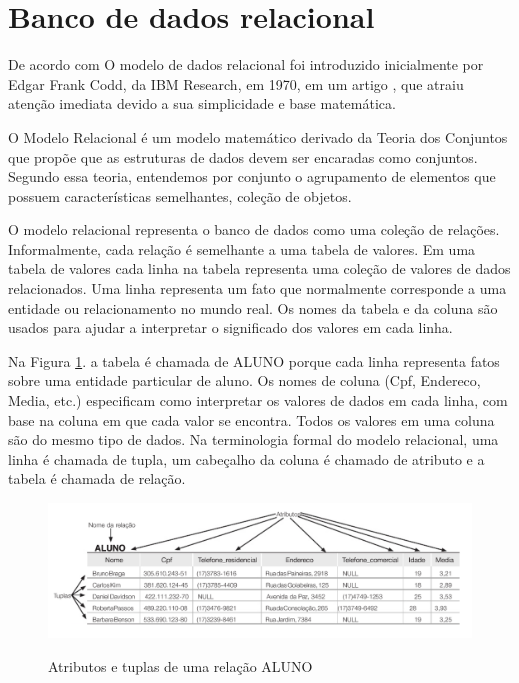 \section{Banco de dados relacional}

De acordo com  O modelo de dados relacional foi introduzido inicialmente por Edgar Frank Codd, da IBM Research, em 1970, em um artigo \cite{codd}, que atraiu atenção imediata devido a sua simplicidade e base matemática.

O Modelo Relacional é um modelo matemático derivado da Teoria dos Conjuntos que propõe que as estruturas de dados devem ser encaradas como conjuntos. Segundo essa teoria, entendemos por conjunto o agrupamento de elementos que possuem características semelhantes, coleção de objetos. 

O modelo relacional representa o banco de dados como uma coleção de relações. Informalmente, cada relação é semelhante a uma tabela de valores. Em uma tabela de valores cada linha na tabela representa uma coleção de valores de dados relacionados. Uma linha representa um fato que normalmente corresponde a uma entidade ou relacionamento no mundo real. Os nomes da tabela e da coluna são usados para ajudar a interpretar o significado dos valores em cada linha. 

Na Figura \ref{fig:1}. a tabela é chamada de ALUNO porque cada linha representa fatos sobre uma entidade particular de aluno. Os nomes de coluna (Cpf, Endereco, Media, etc.) especificam como interpretar os valores de dados em cada linha, com base na coluna em que cada valor se encontra. Todos os valores em uma coluna são do mesmo tipo de dados. Na terminologia formal do modelo relacional, uma linha é chamada de tupla, um cabeçalho da coluna é chamado de atributo e a tabela é chamada de relação.

\begin{figure}[H]
  \setlength{\abovecaptionskip}{0pt}
  \setlength{\belowcaptionskip}{0pt}
  \caption[Atributos e tuplas de uma relação ALUNO]{Atributos e tuplas de uma relação ALUNO}
  \centering
  \includegraphics[width=.95\textwidth]{imagem/RelationalTable.png}
  \captionsetup{justification=centering}
  \label{fig:1}
\end{figure}





